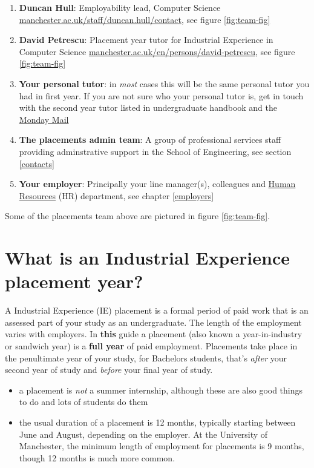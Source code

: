 \documentclass[
]{book}
\providecommand{\tightlist}{%
  \setlength{\itemsep}{0pt}\setlength{\parskip}{0pt}}
\begin{document}
\begin{enumerate}
\def\labelenumi{\arabic{enumi}.}
\tightlist
\item
  \textbf{Duncan Hull}: Employability lead, Computer Science \href{https://personalpages.manchester.ac.uk/staff/duncan.hull/contact}{manchester.ac.uk/staff/duncan.hull/contact}, see figure \ref{fig:team-fig}
\item
  \textbf{David Petrescu}: Placement year tutor for Industrial Experience in Computer Science \href{https://research.manchester.ac.uk/en/persons/david-petrescu}{manchester.ac.uk/en/persons/david-petrescu}, see figure \ref{fig:team-fig}
\item
  \textbf{Your personal tutor}: in \emph{most} cases this will be the same personal tutor you had in first year. If you are not sure who your personal tutor is, get in touch with the second year tutor listed in undergraduate handbook \citep{ughandbook} and the \href{https://studentnet.cs.manchester.ac.uk/ugt/mondaymail/}{Monday Mail} \citep{mondaymail}
\item
  \textbf{The placements admin team}: A group of professional services staff providing adminstrative support in the School of Engineering, see section \ref{contacts}
\item
  \textbf{Your employer}: Principally your line manager(s), colleagues and \href{https://en.wikipedia.org/wiki/Human_resources}{Human Resources} (HR) department, see chapter \ref{employers}
\end{enumerate}

Some of the placements team above are pictured in figure \ref{fig:team-fig}.

\section{What is an Industrial Experience placement year?}\label{placement}

A Industrial Experience (IE) placement is a formal period of paid work that is an assessed part of your study as an undergraduate. \citep{whatisie} The length of the employment varies with employers. In \textbf{this} guide a placement (also known a year-in-industry or sandwich year) is a \textbf{full year} of paid employment. Placements take place in the penultimate year of your study, for Bachelors students, that's \emph{after} your second year of study and \emph{before} your final year of study.

\begin{itemize}
\tightlist
\item
  a placement is \emph{not} a summer internship, although these are also good things to do and lots of students do them
\item
  the usual duration of a placement is 12 months, typically starting between June and August, depending on the employer. At the University of Manchester, the minimum length of employment for placements is 9 months, though 12 months is much more common.
\end{itemize}
\end{document}
